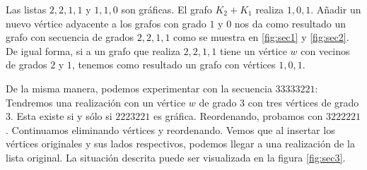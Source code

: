 \begin{ejem}
    \begin{marginfigure}
        \centering
        \caption{}
        \label{fig:sec1}
    \end{marginfigure}
    
    \begin{marginfigure}
        \centering
        \caption{}
        \label{fig:sec2}
    \end{marginfigure}
    
    Las listas $2,2,1,1$ y $1,1,0$ son gráficas. El grafo $K_2 + K_1$ realiza $1,0,1$. Añadir un nuevo vértice adyacente a los grafos con grado $1$ y $0$ nos da como resultado un grafo con secuencia de grados $2,2,1,1$ como se muestra en \ref{fig:sec1} y \ref{fig:sec2}. De igual forma, si a un grafo que realiza $2,2,1,1$ tiene un vértice $w$ con vecinos de grados $2$ y $1$, tenemos como resultado un grafo con vértices $1,0,1$.
    
    De la misma manera, podemos experimentar con la secuencia $33333221$: Tendremos una realización con un vértice $w$ de grado $3$ con tres vértices de grado $3$. Esta existe si y sólo si $2223221$ es gráfica. Reordenando, probamos con $3222221$. Continuamos eliminando vértices y reordenando. Vemos que al insertar los vértices originales y sus lados respectivos, podemos llegar a una realización de la lista original. La situación descrita puede ser visualizada en la figura \ref{fig:sec3}.
    

\end{ejem}
